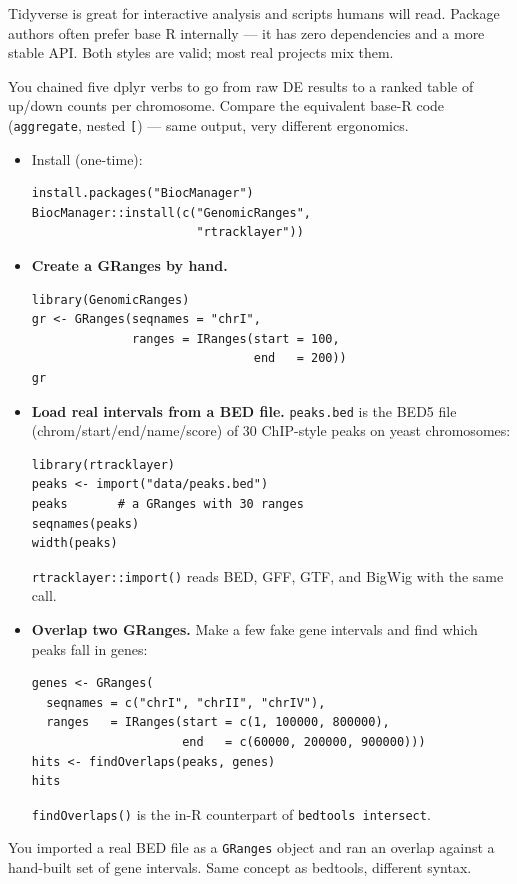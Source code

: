\begin{tipbox}
Tidyverse is great for interactive analysis and scripts humans will read. Package authors often prefer base R internally --- it has zero dependencies and a more stable API. Both styles are valid; most real projects mix them.
\end{tipbox}
\begin{winbox}[Checkpoint]
You chained five dplyr verbs to go from raw DE results to a ranked table of up/down counts per chromosome. Compare the equivalent base-R code (\texttt{aggregate}, nested \texttt{[}) --- same output, very different ergonomics.
\end{winbox}

\begin{itemize}[nosep]
  \item Install (one-time):
    \begin{lstlisting}
install.packages("BiocManager")
BiocManager::install(c("GenomicRanges",
                       "rtracklayer"))
    \end{lstlisting}
  \item \textbf{Create a GRanges by hand.}
    \begin{lstlisting}
library(GenomicRanges)
gr <- GRanges(seqnames = "chrI",
              ranges = IRanges(start = 100,
                               end   = 200))
gr
    \end{lstlisting}
  \item \textbf{Load real intervals from a BED file.} \texttt{peaks.bed} is the BED5 file (chrom/start/end/name/score) of 30 ChIP-style peaks on yeast chromosomes:
    \begin{lstlisting}
library(rtracklayer)
peaks <- import("data/peaks.bed")
peaks       # a GRanges with 30 ranges
seqnames(peaks)
width(peaks)
    \end{lstlisting}
    \texttt{rtracklayer::import()} reads BED, GFF, GTF, and BigWig with the same call.
  \item \textbf{Overlap two GRanges.} Make a few fake gene intervals and find which peaks fall in genes:
    \begin{lstlisting}
genes <- GRanges(
  seqnames = c("chrI", "chrII", "chrIV"),
  ranges   = IRanges(start = c(1, 100000, 800000),
                     end   = c(60000, 200000, 900000)))
hits <- findOverlaps(peaks, genes)
hits
    \end{lstlisting}
    \texttt{findOverlaps()} is the in-R counterpart of \texttt{bedtools intersect}.
\end{itemize}
\begin{winbox}[Checkpoint]
You imported a real BED file as a \texttt{GRanges} object and ran an overlap against a hand-built set of gene intervals. Same concept as bedtools, different syntax.
\end{winbox}


